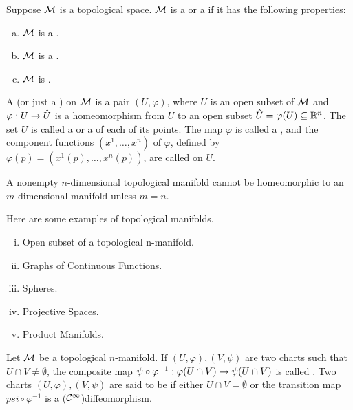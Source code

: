 \documentclass[11pt,a4paper]{article}
\begin{document}
\begin{definition}
Suppose $\mathcal{M}$ is a topological space. $\mathcal{M}$ is a  or a  if it has the following properties:
\begin{enumerate}[(a)]
    \item $\mathcal{M}$ is a .
    \item $\mathcal{M}$ is a .
    \item $\mathcal{M}$ is .
\end{enumerate}
A (or just a ) on $\mathcal{M}$ is a pair $(U,\varphi)$, where $U$ is an open subset of $\mathcal{M}$ and $\varphi:U\rightarrow \hat{U}$ is a homeomorphism from $U$ to an open subset $\hat{U} = \varphi(U)\subseteq \mathbb{R}^n$. The set $U$ is called a  or a  of each of its points. The map $\varphi$ is called a , and the component functions $(x^1,\ldots,x^n)$ of $\varphi$, defined by $\varphi(p) = (x^1(p),\ldots,x^n(p))$, are called  on $U$.
\end{definition}

\begin{prop}
A nonempty $n$-dimensional topological manifold cannot be homeomorphic to an $m$-dimensional manifold unless $m=n$.
\end{prop}

\begin{example}
Here are some examples of topological manifolds.
\begin{enumerate}[(i)]
    \item Open subset of a topological n-manifold.
    \item Graphs of Continuous Functions.
    \item Spheres.
    \item Projective Spaces.
    \item Product Manifolds.
\end{enumerate}
\end{example}

\begin{definition}
Let $\mathcal{M}$ be a topological $n$-manifold. If $(U,\varphi), (V,\psi)$ are two charts such that $U\cap V\neq \emptyset$, the composite map $\psi\circ \varphi^{-1}:\varphi(U\cap V)\rightarrow \psi(U\cap V)$ is called . Two charts $(U,\varphi),(V,\psi)$ are said to be  if either $U\cap V = \emptyset$ or the transition map $psi\circ\varphi^{-1}$ is a ($\mathcal{C}^\infty$)diffeomorphism.
\end{definition}
\end{document}
